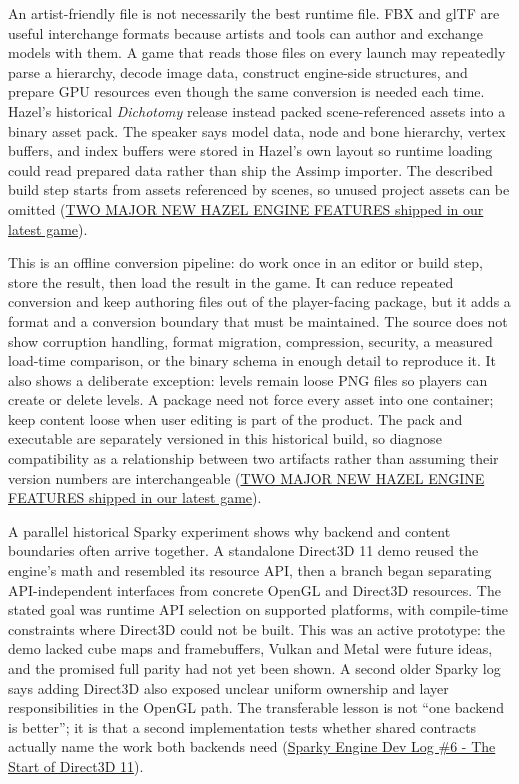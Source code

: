 \hypertarget{06-engine-ii-ch032-move-repeated-asset-work-out-of-the-players-launch-path}{}

An artist-friendly file is not necessarily the best runtime file. FBX and glTF are useful interchange formats because artists and tools can author and exchange models with them. A game that reads those files on every launch may repeatedly parse a hierarchy, decode image data, construct engine-side structures, and prepare GPU resources even though the same conversion is needed each time. Hazel's historical \emph{Dichotomy} release instead packed scene-referenced assets into a binary asset pack. The speaker says model data, node and bone hierarchy, vertex buffers, and index buffers were stored in Hazel's own layout so runtime loading could read prepared data rather than ship the Assimp importer. The described build step starts from assets referenced by scenes, so unused project assets can be omitted (\href{https://www.youtube.com/watch?v=VjlKwQoKluI&t=4m28s}{TWO MAJOR NEW HAZEL ENGINE FEATURES shipped in our latest game}).

This is an offline conversion pipeline: do work once in an editor or build step, store the result, then load the result in the game. It can reduce repeated conversion and keep authoring files out of the player-facing package, but it adds a format and a conversion boundary that must be maintained. The source does not show corruption handling, format migration, compression, security, a measured load-time comparison, or the binary schema in enough detail to reproduce it. It also shows a deliberate exception: levels remain loose PNG files so players can create or delete levels. A package need not force every asset into one container; keep content loose when user editing is part of the product. The pack and executable are separately versioned in this historical build, so diagnose compatibility as a relationship between two artifacts rather than assuming their version numbers are interchangeable (\href{https://www.youtube.com/watch?v=VjlKwQoKluI&t=7m59s}{TWO MAJOR NEW HAZEL ENGINE FEATURES shipped in our latest game}).

A parallel historical Sparky experiment shows why backend and content boundaries often arrive together. A standalone Direct3D 11 demo reused the engine's math and resembled its resource API, then a branch began separating API-independent interfaces from concrete OpenGL and Direct3D resources. The stated goal was runtime API selection on supported platforms, with compile-time constraints where Direct3D could not be built. This was an active prototype: the demo lacked cube maps and framebuffers, Vulkan and Metal were future ideas, and the promised full parity had not yet been shown. A second older Sparky log says adding Direct3D also exposed unclear uniform ownership and layer responsibilities in the OpenGL path. The transferable lesson is not ``one backend is better''; it is that a second implementation tests whether shared contracts actually name the work both backends need (\href{https://www.youtube.com/watch?v=AsNE-eGmGxs&t=2m47s}{Sparky Engine Dev Log \#6 - The Start of Direct3D 11}).

